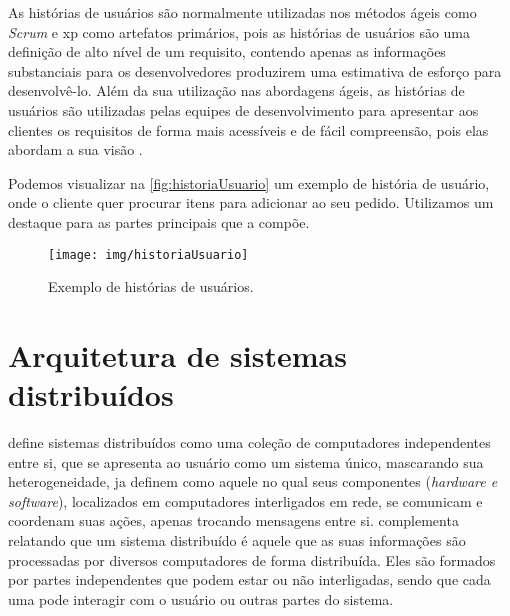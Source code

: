 As histórias de usuários são normalmente utilizadas nos métodos ágeis como \textit{Scrum} e \ac{xp} como artefatos primários, pois as histórias de usuários são uma definição de alto nível de um requisito, contendo apenas as informações substanciais para os desenvolvedores produzirem uma estimativa de esforço para desenvolvê-lo. Além da sua utilização nas abordagens ágeis, as histórias de usuários são utilizadas pelas equipes de desenvolvimento para apresentar aos clientes os requisitos de forma mais acessíveis e de fácil compreensão, pois elas abordam a sua visão \cite{historiasUsuarios2004}.

Podemos visualizar na \autoref{fig:historiaUsuario} um exemplo de história de usuário, onde o cliente quer procurar itens para adicionar ao seu pedido. Utilizamos um destaque para as partes principais que a compõe.  

\begin{figure}[htb]
	\caption{Exemplo de histórias de usuários.}\label{fig:historiaUsuario}
	\begin{center}
		\texttt{[image: img/historiaUsuario]}
	\end{center}
\end{figure}

\section{Arquitetura de sistemas distribuídos}\label{sec:sistemasDistribuidos}

 define sistemas distribuídos como uma coleção de computadores independentes entre si, que se apresenta ao usuário como um sistema único, mascarando sua heterogeneidade,  ja  definem como aquele no qual seus componentes (\textit{hardware e software}), localizados em computadores interligados em rede, se comunicam e coordenam suas ações, apenas trocando mensagens entre si.  complementa relatando que um sistema distribuído é aquele que as suas informações são processadas por diversos computadores de forma distribuída. Eles são formados por partes independentes que podem estar ou não interligadas, sendo que cada uma pode interagir com o usuário ou outras partes do sistema.

